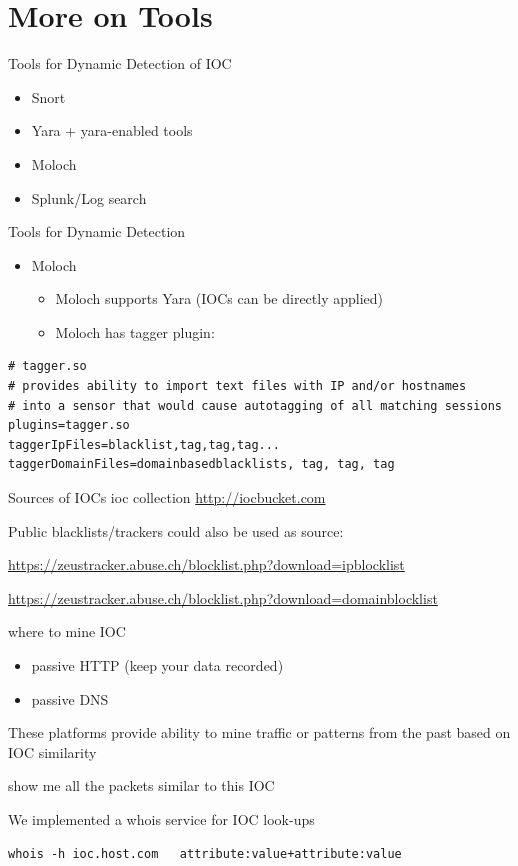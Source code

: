 \documentclass[presentation,smaller]{beamer}
\begin{document}
\section{More on Tools}
\label{sec-7}
\begin{frame}[label=sec-7-1]{Tools for Dynamic Detection of IOC}
\begin{itemize}
\item Snort
\item Yara + yara-enabled tools
\item Moloch
\item Splunk/Log search
\end{itemize}
\end{frame}
\begin{frame}[fragile,label=sec-7-2]{Tools for Dynamic Detection}
 \begin{itemize}
\item Moloch
\begin{itemize}
\item Moloch supports Yara (IOCs can be directly applied)
\item Moloch has tagger plugin:
\end{itemize}
\end{itemize}
\lstset{language=sh,numbers=none}
\begin{lstlisting}
# tagger.so
# provides ability to import text files with IP and/or hostnames 
# into a sensor that would cause autotagging of all matching sessions
plugins=tagger.so
taggerIpFiles=blacklist,tag,tag,tag...
taggerDomainFiles=domainbasedblacklists, tag, tag, tag
\end{lstlisting}
\end{frame}
\begin{frame}[label=sec-7-3]{Sources of IOCs}
ioc collection
\url{http://iocbucket.com}

Public blacklists/trackers could also be used as source:

\url{https://zeustracker.abuse.ch/blocklist.php?download=ipblocklist}

\url{https://zeustracker.abuse.ch/blocklist.php?download=domainblocklist}
\end{frame}
\begin{frame}[fragile,label=sec-7-4]{where to mine IOC}
 \begin{itemize}
\item passive HTTP (keep your data recorded)
\item passive DNS
\end{itemize}

These platforms provide
ability to mine traffic or patterns from the past
based on IOC similarity

\alert{show me all the packets similar to this IOC}

We implemented a whois service for IOC look-ups
\lstset{language=sh,numbers=none}
\begin{lstlisting}
whois -h ioc.host.com   attribute:value+attribute:value
\end{lstlisting}
\end{frame}
\end{document}
